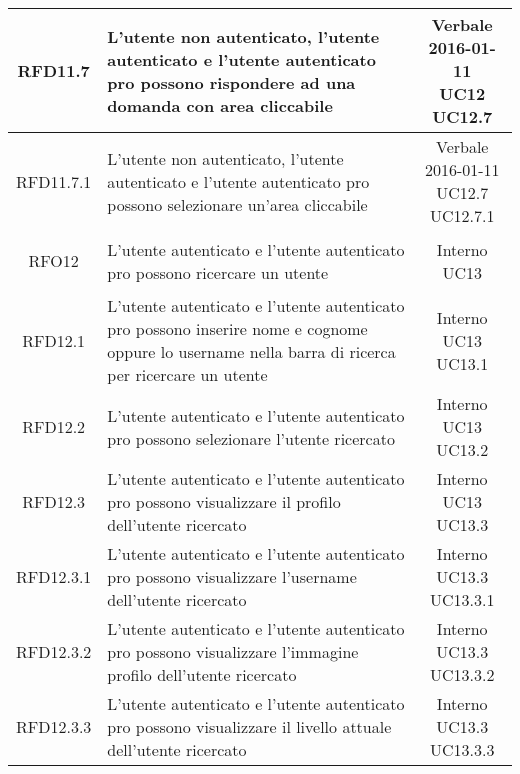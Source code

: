 \begin{longtable}{|c|>{\centering}m{7cm}|c|}
			 \hypertarget{{RFD11.7}}{{RFD11.7}} & L’utente non autenticato, l’utente
autenticato e l’utente autenticato pro
possono rispondere ad una domanda con
area cliccabile & \makecell{Verbale 2016-01-11\\ UC12 \\UC12.7 } \\ \hline
			 \hypertarget{{RFD11.7.1}}{{RFD11.7.1}} & L’utente non autenticato, l’utente
autenticato e l’utente autenticato pro
possono selezionare un’area cliccabile & \makecell{Verbale 2016-01-11\\ UC12.7 \\UC12.7.1 } \\ \hline
			 \hypertarget{{RFO12}}{{RFO12}} & L’utente autenticato e l’utente
autenticato pro possono ricercare un
utente & \makecell{Interno\\ UC13 } \\ \hline
			 \hypertarget{{RFD12.1}}{{RFD12.1}} & L’utente autenticato e l’utente
autenticato pro possono inserire nome e
cognome oppure lo username nella barra
di ricerca per ricercare un utente & \makecell{Interno\\ UC13 \\UC13.1 } \\ \hline
			 \hypertarget{{RFD12.2}}{{RFD12.2}} & L’utente autenticato e l’utente
autenticato pro possono selezionare
l’utente ricercato & \makecell{Interno\\ UC13 \\UC13.2 } \\ \hline
			 \hypertarget{{RFD12.3}}{{RFD12.3}} & L’utente autenticato e l’utente
autenticato pro possono visualizzare il profilo dell'utente ricercato & \makecell{Interno\\ UC13 \\UC13.3 } \\ \hline
			 \hypertarget{{RFD12.3.1}}{{RFD12.3.1}} & L’utente autenticato e l’utente autenticato pro possono visualizzare l'username dell'utente ricercato & \makecell{Interno\\ UC13.3 \\UC13.3.1 } \\ \hline
			 \hypertarget{{RFD12.3.2}}{{RFD12.3.2}} & L’utente autenticato e l’utente autenticato pro possono visualizzare l'immagine profilo dell'utente ricercato & \makecell{Interno\\ UC13.3 \\UC13.3.2 } \\ \hline
			 \hypertarget{{RFD12.3.3}}{{RFD12.3.3}} & L’utente autenticato e l’utente autenticato pro possono visualizzare il livello attuale dell'utente ricercato & \makecell{Interno\\ UC13.3 \\UC13.3.3 } \\ \hline

\end{longtable}
